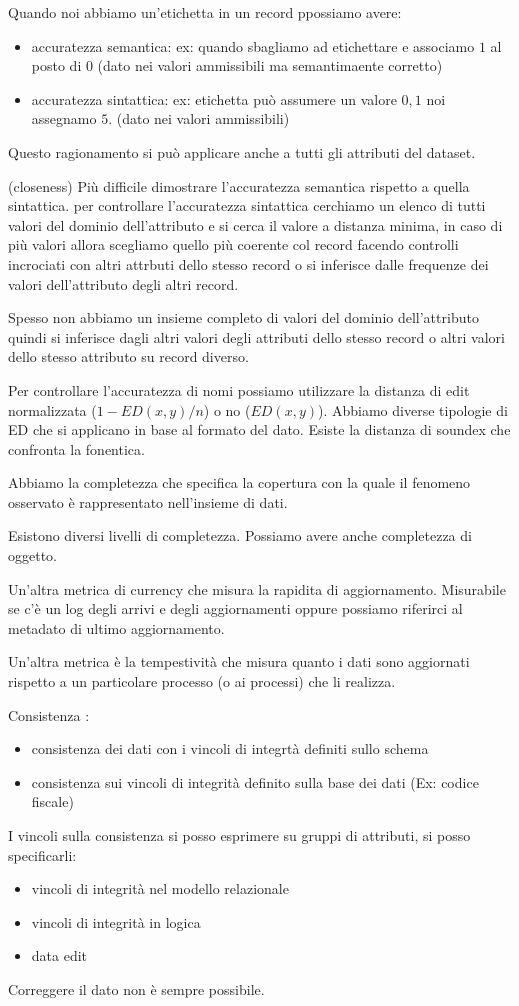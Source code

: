 Quando noi abbiamo un'etichetta in un record ppossiamo avere:
\begin{itemize}
      \item accuratezza semantica: ex: quando sbagliamo ad etichettare e associamo 
      $1$ al posto di $0$ (dato nei valori ammissibili ma semantimaente corretto)
      \item accuratezza sintattica: ex: etichetta può assumere un valore $0,1$ noi 
      assegnamo $5$. (dato nei valori ammissibili)
\end{itemize}
Questo ragionamento si può applicare anche a tutti gli attributi del dataset.

(closeness)
Più difficile dimostrare l'accuratezza semantica rispetto a quella sintattica. 
per controllare l'accuratezza sintattica cerchiamo un elenco di tutti valori del dominio 
dell'attributo e si cerca il valore a distanza minima, in caso di più valori allora 
scegliamo quello più coerente col record facendo controlli incrociati con altri attrbuti 
dello stesso record o si inferisce dalle frequenze dei valori dell'attributo 
degli altri record.

Spesso non abbiamo un insieme completo di valori del dominio dell'attributo
quindi si inferisce dagli altri valori degli attributi dello stesso record o altri 
valori dello stesso attributo su record diverso.

Per controllare l'accuratezza di nomi possiamo utilizzare la distanza di edit normalizzata 
($1-ED(x,y)/n$) o no ($ED(x,y)$). Abbiamo diverse tipologie di ED che si applicano 
in base al formato del dato. Esiste la distanza di soundex che confronta la fonentica.

Abbiamo la completezza che specifica la copertura con la quale il fenomeno osservato
è rappresentato nell'insieme di dati. 

Esistono diversi livelli di completezza.
Possiamo avere anche completezza di oggetto.

Un'altra metrica di currency che misura la rapidita di aggiornamento. Misurabile se 
c'è un log degli arrivi e degli aggiornamenti oppure possiamo riferirci al metadato 
di ultimo aggiornamento.

Un'altra metrica è la tempestività che misura quanto i dati sono aggiornati rispetto 
a un particolare processo (o ai processi) che li realizza.

Consistenza :
\begin{itemize}
      \item  consistenza dei dati con i vincoli di integrtà definiti sullo schema 
      \item consistenza sui vincoli di integrità definito sulla base dei dati (Ex: codice fiscale)
\end{itemize}
I vincoli sulla consistenza si posso esprimere su gruppi di attributi, si posso specificarli:
\begin{itemize}
      \item vincoli di integrità nel modello relazionale
      \item vincoli di integrità in logica
      \item data edit 
\end{itemize}
Correggere il dato non è sempre possibile.


